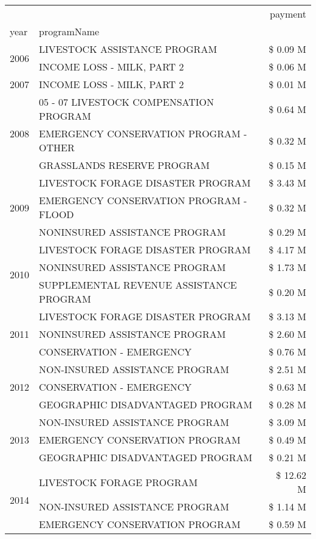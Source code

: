 \begin{tabular}{llr}
\toprule
 &  & payment \\
year & programName &  \\
\midrule
\multirow[t]{2}{*}{2006} & LIVESTOCK ASSISTANCE PROGRAM & \$ 0.09 M \\
 & INCOME LOSS - MILK, PART 2 & \$ 0.06 M \\
\cline{1-3}
2007 & INCOME LOSS - MILK, PART 2 & \$ 0.01 M \\
\cline{1-3}
\multirow[t]{3}{*}{2008} & 05 - 07 LIVESTOCK COMPENSATION PROGRAM & \$ 0.64 M \\
 & EMERGENCY CONSERVATION PROGRAM - OTHER & \$ 0.32 M \\
 & GRASSLANDS RESERVE PROGRAM & \$ 0.15 M \\
\cline{1-3}
\multirow[t]{3}{*}{2009} & LIVESTOCK FORAGE DISASTER  PROGRAM & \$ 3.43 M \\
 & EMERGENCY CONSERVATION PROGRAM - FLOOD & \$ 0.32 M \\
 & NONINSURED ASSISTANCE PROGRAM & \$ 0.29 M \\
\cline{1-3}
\multirow[t]{3}{*}{2010} & LIVESTOCK FORAGE DISASTER  PROGRAM & \$ 4.17 M \\
 & NONINSURED ASSISTANCE PROGRAM & \$ 1.73 M \\
 & SUPPLEMENTAL REVENUE ASSISTANCE PROGRAM & \$ 0.20 M \\
\cline{1-3}
\multirow[t]{3}{*}{2011} & LIVESTOCK FORAGE DISASTER PROGRAM & \$ 3.13 M \\
 & NONINSURED ASSISTANCE PROGRAM & \$ 2.60 M \\
 & CONSERVATION - EMERGENCY & \$ 0.76 M \\
\cline{1-3}
\multirow[t]{3}{*}{2012} & NON-INSURED ASSISTANCE PROGRAM & \$ 2.51 M \\
 & CONSERVATION - EMERGENCY & \$ 0.63 M \\
 & GEOGRAPHIC DISADVANTAGED PROGRAM & \$ 0.28 M \\
\cline{1-3}
\multirow[t]{3}{*}{2013} & NON-INSURED ASSISTANCE PROGRAM & \$ 3.09 M \\
 & EMERGENCY CONSERVATION PROGRAM & \$ 0.49 M \\
 & GEOGRAPHIC DISADVANTAGED PROGRAM & \$ 0.21 M \\
\cline{1-3}
\multirow[t]{3}{*}{2014} & LIVESTOCK FORAGE PROGRAM & \$ 12.62 M \\
 & NON-INSURED ASSISTANCE PROGRAM & \$ 1.14 M \\
 & EMERGENCY CONSERVATION PROGRAM & \$ 0.59 M \\

\end{tabular}
